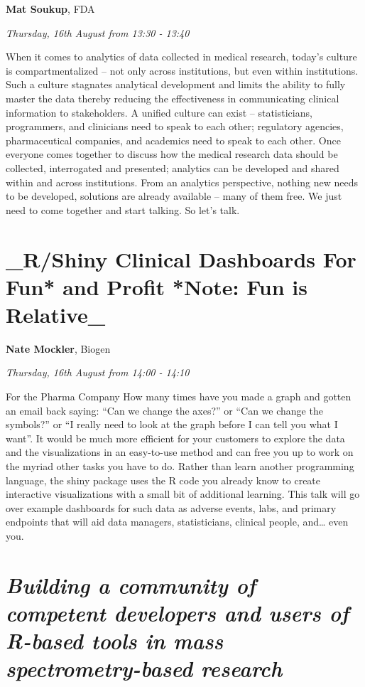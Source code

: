 \documentclass[]{book}
\theoremstyle{definition}
\theoremstyle{definition}
\theoremstyle{definition}
\theoremstyle{remark}
\begin{document}
\textbf{Mat Soukup}, FDA

\emph{Thursday, 16th August from 13:30 - 13:40}

When it comes to analytics of data collected in medical research,
today's culture is compartmentalized -- not only across institutions,
but even within institutions. Such a culture stagnates analytical
development and limits the ability to fully master the data thereby
reducing the effectiveness in communicating clinical information to
stakeholders. A unified culture can exist -- statisticians, programmers,
and clinicians need to speak to each other; regulatory agencies,
pharmaceutical companies, and academics need to speak to each other.
Once everyone comes together to discuss how the medical research data
should be collected, interrogated and presented; analytics can be
developed and shared within and across institutions. From an analytics
perspective, nothing new needs to be developed, solutions are already
available -- many of them free. We just need to come together and start
talking. So let's talk.

\hypertarget{rshiny-clinical-dashboards-for-fun-and-profit-note-fun-is-relative_}{%
\section{\_R/Shiny Clinical Dashboards For Fun* and Profit *Note: Fun is
Relative\_}\label{rshiny-clinical-dashboards-for-fun-and-profit-note-fun-is-relative_}}

\textbf{Nate Mockler}, Biogen

\emph{Thursday, 16th August from 14:00 - 14:10}

For the Pharma Company How many times have you made a graph and gotten
an email back saying: ``Can we change the axes?'' or ``Can we change the
symbols?'' or ``I really need to look at the graph before I can tell you
what I want''. It would be much more efficient for your customers to
explore the data and the visualizations in an easy-to-use method and can
free you up to work on the myriad other tasks you have to do. Rather
than learn another programming language, the shiny package uses the R
code you already know to create interactive visualizations with a small
bit of additional learning. This talk will go over example dashboards
for such data as adverse events, labs, and primary endpoints that will
aid data managers, statisticians, clinical people, and\ldots{} even you.

\hypertarget{building-a-community-of-competent-developers-and-users-of-r-based-tools-in-mass-spectrometry-based-research}{%
\section{\texorpdfstring{\emph{Building a community of competent
developers and users of R-based tools in mass spectrometry-based
research}}{Building a community of competent developers and users of R-based tools in mass spectrometry-based research}}\label{building-a-community-of-competent-developers-and-users-of-r-based-tools-in-mass-spectrometry-based-research}}
\end{document}

